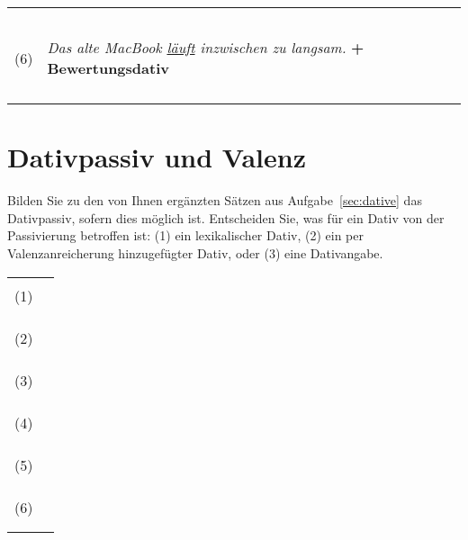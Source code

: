 \documentclass[12pt,a4paper,twoside]{article}
\begin{document}
\begin{center}
\begin{longtable}[h]{cp{}}
    &\\
    &\\\cline{2-2}
    &\\
    &\\\cline{2-2}
    &\\
    (6)  & \textit{Das alte MacBook \ul{läuft} inzwischen zu langsam.} \textbf{+ Bewertungsdativ}\\
    &\\
    &\\\cline{2-2}
    &\\
    &\\\cline{2-2}
  \end{longtable}
\end{center}

\section{Dativpassiv und Valenz}\label{sec:dativpassiv}

Bilden Sie zu den von Ihnen ergänzten Sätzen aus Aufgabe~\ref{sec:dative} das Dativpassiv, sofern dies möglich ist.
Entscheiden Sie, was für ein Dativ von der Passivierung betroffen ist: (1) ein lexikalischer Dativ, (2) ein per Valenzanreicherung hinzugefügter Dativ, oder (3) eine Dativangabe.

\begin{center}
  \begin{longtable}[h]{cp{}}
    &\\
    (1) & \\\cline{2-2}
    &\\
    &\\\cline{2-2}
    &\\
    (2) & \\\cline{2-2}
    &\\
    &\\\cline{2-2}
    &\\
    (3) & \\\cline{2-2}
    &\\
    &\\\cline{2-2}
    &\\
    (4) & \\\cline{2-2}
    &\\
    &\\\cline{2-2}
    &\\
    (5) & \\\cline{2-2}
    &\\
    &\\\cline{2-2}
    &\\
    (6) & \\\cline{2-2}
    &\\
    &\\\cline{2-2}
  \end{longtable}
\end{center}
\end{document}
